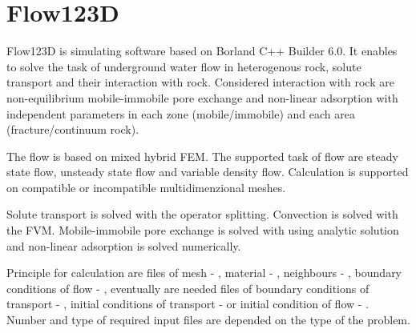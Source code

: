 %
%
%
%

\setcounter{page}{2}

\section*{Flow123D}

Flow123D is simulating software based on Borland C++ Builder 6.0. It enables to solve the task of underground water flow in heterogenous rock, solute transport and their interaction with rock. Considered interaction with rock are non-equilibrium mobile-immobile pore exchange and non-linear adsorption with independent parameters in each zone (mobile/immobile) and each area (fracture/continuum rock).

The flow is based on mixed hybrid FEM. The supported task of flow are steady state flow, unsteady state flow and variable density flow. Calculation is supported on compatible or incompatible multidimenzional meshes. 

Solute transport is solved with the operator splitting.  Convection is solved with the FVM. Mobile-immobile pore exchange is solved with using analytic solution and non-linear adsorption is solved numerically.

Principle for calculation are files of mesh - , material - , neighbours - , boundary conditions of flow - , eventually are needed files of boundary conditions of transport - , initial conditions of transport -  or initial condition of flow - . Number and type of required input files are depended on the type of the problem.

